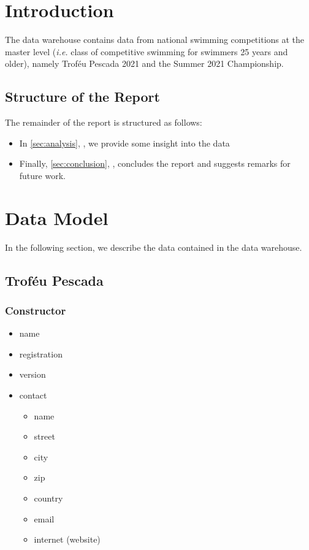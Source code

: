 \documentclass[a4paper, 11pt]{article}
\begin{document}
\pagebreak

\tableofcontents
\listoffigures \pagebreak


\section{Introduction}

The data warehouse contains data from national swimming competitions at the master level (\textit{i.e.} class of competitive swimming for swimmers 25 years and older), namely Troféu Pescada 2021 and the Summer 2021 Championship.

\subsection*{Structure of the Report}

The remainder of the report is structured as follows:

\begin{itemize}
    \item In \cref{sec:analysis}, \textbf{}, we provide some insight into the data 
    \item Finally, \cref{sec:conclusion}, \textbf{}, concludes the report and suggests remarks for future work.
\end{itemize}

\pagebreak

\section{Data Model} \label{sec:data-model}

In the following section, we describe the data contained in the data warehouse.

\subsection{Troféu Pescada}

\subsubsection*{Constructor}

\begin{itemize}
    \item name
    \item registration
    \item version
    \item contact
    \begin{itemize}
        \item name
        \item street
        \item city
        \item zip
        \item country
        \item email
        \item internet (website)
    \end{itemize}
\end{itemize}
\end{document}
